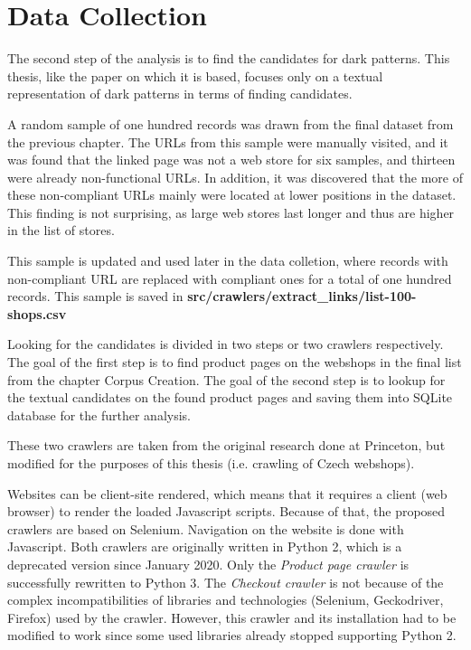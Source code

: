 \chapter{Data Collection}

The second step of the analysis is to find the candidates for dark patterns. This thesis, like the paper on which it is based\cite{dark-patterns-at-scale}, focuses only on a textual representation of dark patterns in terms of finding candidates.

A random sample of one hundred records was drawn from the final dataset from the previous chapter. The URLs from this sample were manually visited, and it was found that the linked page was not a web store for six samples, and thirteen were already non-functional URLs. In addition, it was discovered that the more of these non-compliant URLs mainly were located at lower positions in the dataset. This finding is not surprising, as large web stores last longer and thus are higher in the list of stores.

This sample is updated and used later in the data colletion, where records with non-compliant URL are replaced with compliant ones for a total of one hundred records. This sample is saved in \textbf{src/crawlers/extract\_links/list-100-shops.csv}

Looking for the candidates is divided in two steps or two crawlers respectively. The goal of the first step is to find product pages on the webshops in the final list from the chapter Corpus Creation. The goal of the second step is to lookup for the textual candidates on the found product pages and saving them into SQLite database for the further analysis.

These two crawlers are taken from the original research done at Princeton\cite{dark-patterns-at-scale}, but modified for the purposes of this thesis (i.e. crawling of Czech webshops).

Websites can be client-site rendered, which means that it requires a client (web browser) to render the loaded Javascript scripts. Because of that, the proposed crawlers are based on Selenium. Navigation on the website is done with Javascript.  Both crawlers are originally written in Python 2, which is a deprecated version since January 2020. Only the \emph{Product page crawler} is successfully rewritten to Python 3. The \emph{Checkout crawler} is not because of the complex incompatibilities of libraries and technologies (Selenium, Geckodriver, Firefox) used by the crawler. However, this crawler and its installation had to be modified to work since some used libraries already stopped supporting Python 2.

